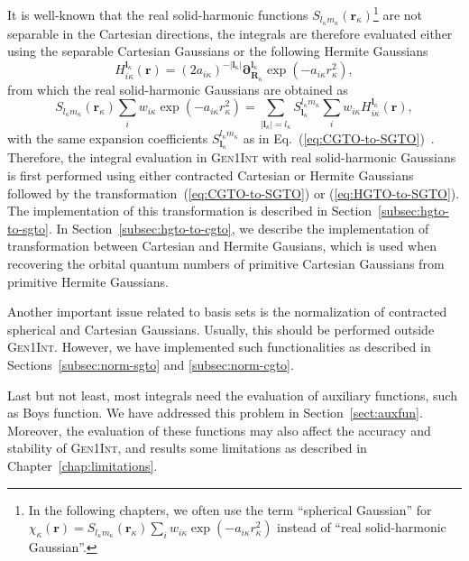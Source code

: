 \documentclass[a4paper,11pt,twoside,openright]{book}
\begin{document}
It is well-known that the real solid-harmonic functions
$S_{l_{\kappa}m_{\kappa}}(\boldsymbol{r}_{\kappa})$\footnote{In the following chapters,
we often use the term ``spherical Gaussian'' for $\chi_{\kappa}(\boldsymbol{r})%
=S_{l_{\kappa}m_{\kappa}}(\boldsymbol{r}_{\kappa})\sum_{i}w_{i\kappa}\exp\left(-a_{i\kappa}r_{\kappa}^{2}\right)$
instead of ``real solid-harmonic Gaussian''.} are not separable in the Cartesian directions,
the integrals are therefore evaluated either using the separable Cartesian Gaussians or
the following Hermite Gaussians
\begin{equation}
  \label{eq:HGTO}
  H_{i\kappa}^{\boldsymbol{l}_{\kappa}}(\boldsymbol{r})
    =(2a_{i\kappa})^{-|\boldsymbol{l}_{\kappa}|}%
      {\boldsymbol{\partial}}^{\boldsymbol{l}_{\kappa}}_{\boldsymbol{R}_{\kappa}}\exp(-a_{i\kappa}r_{\kappa}^2),
\end{equation}
from which the real solid-harmonic Gaussians are obtained as~\cite{Helgaker:2000}
\begin{equation}
  \label{eq:HGTO-to-SGTO}
  S_{l_{\kappa}m_{\kappa}}(\boldsymbol{r}_{\kappa})\sum_{i}w_{i\kappa}\exp\left(-a_{i\kappa}r_{\kappa}^{2}\right)
  =\sum_{|\boldsymbol{l}_{\kappa}|=l_{\kappa}}S^{l_{\kappa}m_{\kappa}}_{\boldsymbol{l}_{\kappa}}%
    \sum_{i}w_{i\kappa}H_{i\kappa}^{\boldsymbol{l}_{\kappa}}(\boldsymbol{r}),
\end{equation}
with the same expansion coefficients $S^{l_{\kappa}m_{\kappa}}_{\boldsymbol{l}_{\kappa}}$ as in
Eq.~(\ref{eq:CGTO-to-SGTO})~\cite{Reine:PCCP9:4771}. Therefore, the integral evaluation in
\textsc{Gen1Int} with real solid-harmonic Gaussians is first performed using either contracted
Cartesian or Hermite Gaussians followed by the transformation~(\ref{eq:CGTO-to-SGTO})
or (\ref{eq:HGTO-to-SGTO}). The implementation of this transformation is described in
Section~\ref{subsec:hgto-to-sgto}. In Section~\ref{subsec:hgto-to-cgto}, we describe the implementation
of transformation between Cartesian and Hermite Gausians, which is used when recovering the orbital
quantum numbers of primitive Cartesian Gaussians from primitive Hermite Gaussians.

Another important issue related to basis sets is the normalization of contracted spherical
and Cartesian Gaussians. Usually, this should be performed outside \textsc{Gen1Int}. However,
we have implemented such functionalities as described in Sections~\ref{subsec:norm-sgto}
and \ref{subsec:norm-cgto}.

Last but not least, most integrals need the evaluation of auxiliary functions, such as Boys function.
We have addressed this problem in Section~\ref{sect:auxfun}. Moreover, the evaluation of these
functions may also affect the accuracy and stability of \textsc{Gen1Int}, and results some limitations
as described in Chapter~\ref{chap:limitations}.
\end{document}
